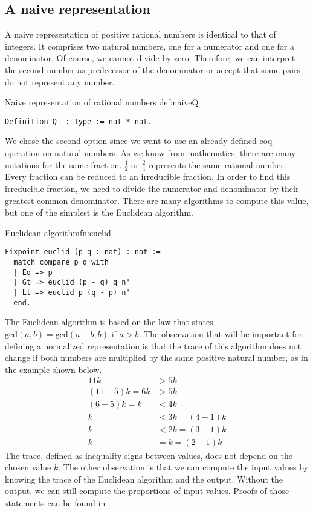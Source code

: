 \subsection{A naive representation}
A naive representation of positive rational numbers is identical to that of integers. It comprises two natural numbers, one for a numerator and one for a denominator. Of course, we cannot divide by zero. Therefore, we can interpret the second number as predecessor of the denominator or accept that some pairs do not represent any number.
\begin{defi}{Naive representation of rational numbers }{def:naiveQ}
\begin{verbatim}
Definition Q' : Type := nat * nat.
\end{verbatim}
\end{defi}
We chose the second option since we want to use an already defined coq operation on natural numbers. As we know from mathematics, there are many notations for the same fraction. $\frac{1}{2}$ or $\frac{2}{4}$ represents the same rational number. Every fraction can be reduced to an irreducible fraction. In order to find this irreducible fraction, we need to divide the numerator and denominator by their greatest common denominator. There are many algorithms to compute this value, but one of the simplest is the Euclidean algorithm.
\begin{func}{Euclidean algorithm}{fn:euclid}
\begin{verbatim}
Fixpoint euclid (p q : nat) : nat :=
  match compare p q with
  | Eq => p
  | Gt => euclid (p - q) q n'
  | Lt => euclid p (q - p) n'
  end.
\end{verbatim}
\end{func}
The Euclidean algorithm is based on the law that states $\textrm{gcd}(a, b) = \textrm{gcd}(a - b, b)$ if $a > b$. The observation that will be important for defining a normalized representation is that the trace of this algorithm does not change if both numbers are multiplied by the same positive natural number, as in the example shown below.
\begin{equation}
    \begin{split}
        11k&>5k\\
        (11-5)k=6k&>5k\\
        (6-5)k=k&<4k\\
        k&<3k=(4-1)k\\
        k&<2k=(3-1)k\\
        k&=k=(2-1)k
    \end{split}
\end{equation}
The trace,  defined as inequality signs between values, does not depend on the chosen value $k$. The other observation is that we can compute the input values by knowing the trace of the Euclidean algorithm and the output. Without the output, we can still compute the proportions of input values. Proofs of those statements can be found in .

